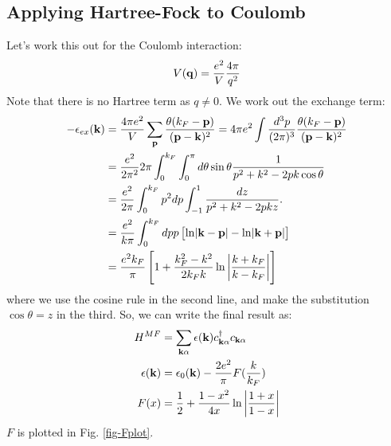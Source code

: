 \subsection{Applying Hartree-Fock to Coulomb}
Let's work this out for the Coulomb interaction:
\begin{align*}
    V(\mathbf{q}) = \frac{e^2}{V}\frac{4\pi}{q^2}
\end{align*}
Note that there is no Hartree term as $q \neq 0$. We work out the exchange term:
\begin{equation}
    \begin{split}
        -\epsilon_{ex}(\mathbf{k}) &= \frac{4\pi e^2}{V}\sum_{\mathbf{p}}\frac{\theta(k_F - \mathbf{p})}{(\mathbf{p} - \mathbf{k})^2} = 4\pi e^2 \int \frac{d^3p}{(2\pi)^3}\frac{\theta(k_F - \mathbf{p})}{(\mathbf{p} - \mathbf{k})^2}
        \\ &= \frac{e^2}{2\pi^2}2\pi \int_0^{k_F} \int_0^\pi d\theta\sin\theta\frac{1}{p^2 + k^2 - 2pk\cos\theta}
        \\ &= \frac{e^2}{2\pi}\int_0^{k_F}p^2dp \int_{-1}^1 \frac{dz}{p^2 + k^2 - 2pkz}.
        \\ &= \frac{e^2}{k\pi}\int_0^{k_F} dp p\left[\ln\lvert \mathbf{k} - \mathbf{p} \rvert - \ln\lvert \mathbf{k} + \mathbf{p} \rvert\right]
        \\ &= \frac{e^2k_F}{\pi}\left[1 + \frac{k_F^2 - k^2}{2k_Fk}\ln\left|\frac{k + k_F}{k - k_F}\right|\right]
    \end{split}
\end{equation}
where we use the cosine rule in the second line, and make the substitution $\cos\theta = z$ in the third. So, we can write the final result as:
\begin{equation}
    \begin{split}
        H^{MF} &= \sum_{\mathbf{k}\alpha}\epsilon(\mathbf{k})c_{\mathbf{k}\alpha}^\dagger c_{\mathbf{k}\alpha}
        \\ \epsilon(\mathbf{k}) &= \epsilon_0(\mathbf{k}) - \frac{2e^2}{\pi}F(\frac{k}{k_F})
        \\ F(x) &= \frac{1}{2} + \frac{1-x^2}{4x}\ln\left|\frac{1 + x}{1-x}\right|
    \end{split}
\end{equation}
$F$ is plotted in Fig. \ref{fig-Fplot}.

